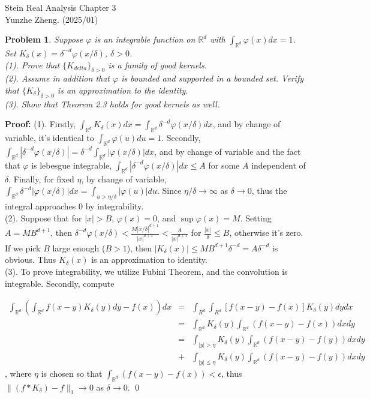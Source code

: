 \documentclass[12pt]{article}
\newtheorem{problem}{Problem}
\begin{document}
\noindent Stein Real Analysis \hfill Chapter 3\\
Yunzhe Zheng. (2025/01)

\hrulefill

\begin{problem}
Suppose $\varphi$ is an integrable function on $\mathbb{R}^{d}$ with $\int_{\mathbb{R}^{d}}\varphi(x)dx = 1$. Set $K_{\delta}(x) = \delta^{-d}\varphi(x/\delta)$, $\delta > 0$. \\

(1). Prove that $\{K_{delta}\}_{\delta>0}$ is a family of good kernels. \\
\indent (2). Assume in addition that $\varphi$ is bounded and supported in a bounded set. Verify that $\{K_{\delta}\}_{\delta>0}$ is an approximation to the identity. \\
\indent (3). Show that Theorem 2.3 holds for good kernels as well.
\end{problem}

\textbf{Proof:} (1). Firstly, $\int_{\mathbb{R}^{d}}K_{\delta}(x)dx = \int_{\mathbb{R}^{d}}\delta^{-d}\varphi(x/\delta)dx$, and by change of variable, it's identical to $\int_{\mathbb{R}^{d}}\varphi(u)du = 1$. Secondly, $\int_{\mathbb{R}^{d}}\left | \delta^{-d} \varphi(x/\delta)\right | = \delta^{-d}\int_{\mathbb{R}^{d}}|\varphi(x/\delta)|dx$, and by change of variable and the fact that $\varphi$ is lebesgue integrable, $\int_{\mathbb{R}^{d}}|\delta^{-d}\varphi(x/\delta)|dx \leq A$ for some $A$ independent of $\delta$. Finally, for fixed $\eta$,  by change of variable, $\int_{\mathbb{R}^{d}}\delta^{-d}|\varphi(x/\delta)|dx = \int_{u>\eta / \delta}|\varphi(u)|du$. Since $\eta / \delta\to\infty$ as $\delta\to 0$, thus the integral approaches 0 by integrability. \\

(2). Suppose that for $|x| > B$, $\varphi(x) = 0$, and $\sup\varphi(x) = M$. Setting $A = MB^{d+1}$, then $\delta^{-d}\varphi(x/\delta)< \frac{M|x/\delta|^{d+1}}{|x|^{d+1}} < \frac{A}{|x|^{d+1}}$ for $\frac{|x|}{\delta}\leq B$, otherwise it's zero. If we pick $B$ large enough ($B > 1$), then $|K_{\delta}(x)| \leq MB^{d+1}\delta^{-d} = A\delta^{-d}$ is obvious. Thus $K_{\delta}(x)$ is an approximation to identity. \\

(3). To prove integrability, we utilize Fubini Theorem, and the convolution is integrable. Secondly, compute

\begin{eqnarray*}
\int_{\mathbb{R}^{d}}(\int_{\mathbb{R}^{d}}f(x-y)K_{\delta}(y)dy - f(x))dx 
&=& \int_{R^{d}}\int_{R^{d}}\left [ f(x-y) - f(x)\right]K_{\delta}(y)dydx \\
&=& \int_{\mathbb{R}^{d}}K_{\delta}(y)\int_{\mathbb{R^{d}}}(f(x-y) - f(x))dxdy \\
&=& \int_{|y| > \eta}K_{\delta}(y)\int_{\mathbb{R}^{d}}(f(x-y) - f(y))dxdy \\
&+& \int_{|y|\leq \eta}K_{\delta}(y)\int_{\mathbb{R}^{d}}(f(x-y)  - f(y))dxdy 
\end{eqnarray*}, where $\eta$ is chosen so that $\int_{\mathbb{R}^{d}}(f(x - y) - f(x))<\epsilon$, thus $\|(f \ast K_{\delta}) - f\|_{1}\to 0$ as $\delta\to 0$. \qed
\end{document}
